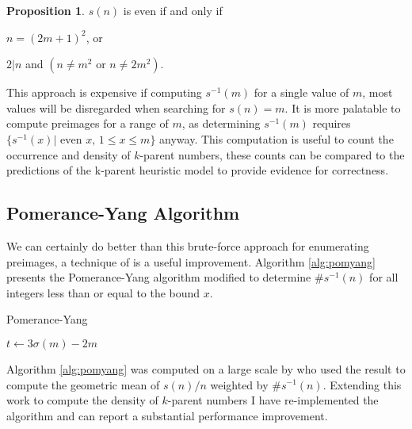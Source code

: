 \documentclass{article}
\theoremstyle{definition}
\newtheorem{proposition}{Proposition}[section]
\begin{document}
\begin{proposition} $s(n)$ is even if and only if

    $n = (2m+1)^2$, or

    $2 | n$ and $(n \neq m^2 \text{ or } n \neq 2m^2)$.
\end{proposition}

This approach is expensive if computing $s^{-1}(m)$ for a single value of $m$, most values will be disregarded when searching for $s(n) = m$. It is more palatable to compute preimages for a range of $m$, as determining $s^{-1}(m)$ requires $\{s^{-1}(x)|\text{ even } x,\, 1 \leq x \leq m\}$ anyway. This computation is useful to count the occurrence and density of $k$-parent numbers, these counts can be compared to the predictions of the k-parent heuristic model to provide evidence for correctness.

\subsection{Pomerance-Yang Algorithm}
We can certainly do better than this brute-force approach for enumerating preimages, a technique of \cite{pomYang} is a useful improvement. Algorithm \ref{alg:pomyang} presents the Pomerance-Yang algorithm modified to determine $\#s^{-1}(n)$ for all integers less than or equal to the bound $x$.

\begin{algorithm}[H]
    \caption{Pomerance-Yang}
    \label{alg:pomyang}
    \begin{algorithmic}[1]
        \State $t \gets 3\sigma(m) - 2m$
        \EndWhile
        \EndIf
         
        \EndIf
        \EndFor
        \ForAll{odd composite $m \in [1, x^{2/3})$}
        \EndIf
        \EndFor
        \EndProcedure
    \end{algorithmic}
\end{algorithm}

Algorithm \ref{alg:pomyang} was computed on a large scale by \cite{chum_guy_jacobson_mosunov_2018} who used the result to compute the geometric mean of $s(n) / n$ weighted by $\#s^{-1}(n)$. Extending this work to compute the density of $k$-parent numbers I have re-implemented the algorithm and can report a substantial performance improvement.



\end{document}

